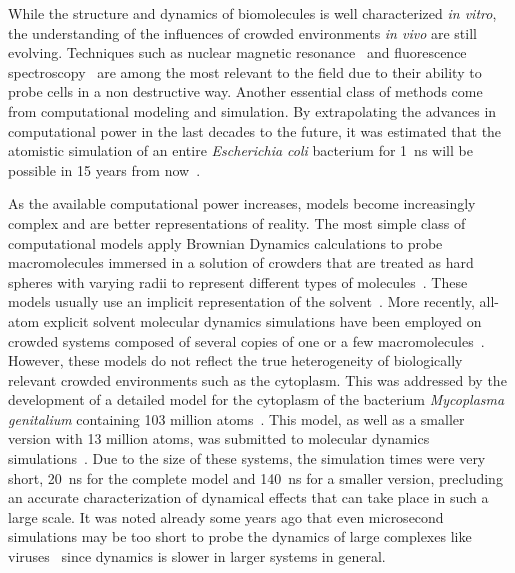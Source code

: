 \documentclass[journal=jcisd8,manuscript=article]{achemso}
\begin{document}
While the structure and dynamics of biomolecules is well characterized
\textit{in vitro}, the understanding of the influences of crowded
environments \textit{in vivo} are still evolving.  Techniques such as
nuclear magnetic resonance~\cite{reckel2007,pielak2008} and
fluorescence spectroscopy~\cite{ignatova2004,xie2008,English2011} are
among the most relevant to the field due to their ability to probe
cells in a non destructive way. Another essential class of methods
come from computational modeling and simulation. By extrapolating the
advances in computational power in the last decades to the future, it
was estimated that the atomistic simulation of an entire
\textit{Escherichia coli} bacterium for \SI{1}{\nano\second} will be
possible in 15 years from now~\cite{vanGunsteren2006a}.

As the available computational power increases, models become
increasingly complex and are better representations of reality. The
most simple class of computational models apply Brownian Dynamics
calculations to probe macromolecules immersed in a solution of
crowders that are treated as hard spheres with varying radii to
represent different types of molecules~\cite{Ando2010}. These models
usually use an implicit representation of the
solvent~\cite{Mcguffee2010}. More recently, all-atom explicit solvent
molecular dynamics simulations have been employed on crowded systems
composed of several copies of one or a few
macromolecules~\cite{Wang2017c}. However, these models do not reflect
the true heterogeneity of biologically relevant crowded environments
such as the cytoplasm. This was addressed by the development of a
detailed model for the cytoplasm of the bacterium \textit{Mycoplasma
  genitalium} containing 103 million atoms~\cite{Feig2015}. This
model, as well as a smaller version with 13 million atoms, was
submitted to molecular dynamics simulations~\cite{Yu2016a}. Due to the
size of these systems, the simulation times were very short,
\SI{20}{\nano\second} for the complete model and
\SI{140}{\nano\second} for a smaller version, precluding an accurate
characterization of dynamical effects that can take place in such a
large scale. It was noted already some years ago that even
{microsecond} simulations may be too short to probe the dynamics of
large complexes like viruses~\cite{Larsson2012a} since dynamics is
slower in larger systems in general.
\end{document}
